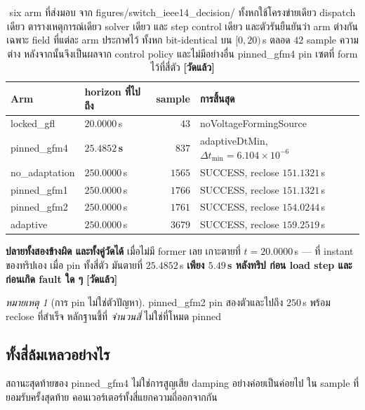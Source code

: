 \documentclass[12pt,a4paper]{article}
\theoremstyle{remark}
\newtheorem{remark}{หมายเหตุ}
\newcommand{\code}[1]{{\ttfamily\small\hyphenchar\font=-1 #1}}
\newcommand{\measured}{\textcolor{ok}{\textbf{[วัดแล้ว]}}}
\begin{document}
\begin{table}[H]
\centering
\small
\begin{tabular}{@{}llrl@{}}
\toprule
\textbf{Arm} & \textbf{horizon ที่ไปถึง} & \textbf{sample} & \textbf{การสิ้นสุด}\\
\midrule
\code{locked\_gfl}     & $20.0000$\,s & $43$       & \code{noVoltageFormingSource}\\
\code{pinned\_gfm4}    & \textcolor{no}{$\mathbf{25.4852}$\,\textbf{s}} & $837$ & \code{adaptiveDtMin}, $\Delta t_{\min}=6.104\times10^{-6}$\\
\code{no\_adaptation}  & $250.0000$\,s & $1565$   & \code{SUCCESS}, reclose $151.1321$\,s\\
\code{pinned\_gfm1}    & $250.0000$\,s & $1766$   & \code{SUCCESS}, reclose $151.1321$\,s\\
\code{pinned\_gfm2}    & $250.0000$\,s & $1761$   & \code{SUCCESS}, reclose $154.0244$\,s\\
\code{adaptive}        & $250.0000$\,s & $3679$   & \code{SUCCESS}, reclose $159.2519$\,s\\
\bottomrule
\end{tabular}
\caption{six arm ที่ส่งมอบ จาก
\code{figures/switch\_ieee14\_decision/}\allowbreak\code{comparison\_summary.tex}
ทั้งหกใช้โครงข่ายเดียว dispatch เดียว ตารางเหตุการณ์เดียว solver เดียว และ
step control เดียว และตัวรันยืนยันว่า arm ต่างกันเฉพาะ field ที่แต่ละ arm
ประกาศไว้ ทั้งหก bit-identical บน $[0,20)$\,s ตลอด $42$ sample ความต่าง
หลังจากนั้นจึงเป็นผลจาก control policy และไม่มีอย่างอื่น
\code{pinned\_gfm4} pin เซตที่ form ไว้ที่สี่ตัว \measured}
\label{tab:armcmp}
\end{table}

\textbf{ปลายทั้งสองข้างผิด และทั้งคู่วัดได้} เมื่อไม่มี former เลย เกาะตายที่
$t=20.0000$\,s --- ที่ instant ของทริปเอง เมื่อ pin ทั้งสี่ตัว มันตายที่
$25.4852$\,s \textbf{เพียง $5.49$\,s หลังทริป ก่อน load step และก่อนเกิด
fault ใด ๆ} \measured

\begin{remark}[การ pin ไม่ใช่ตัวปัญหา]
\code{pinned\_gfm2} pin สองตัวและไปถึง $250$\,s พร้อม reclose ที่สำเร็จ
หลักฐานชี้ที่ \emph{จำนวนสี่} ไม่ใช่ที่โหมด pinned
\end{remark}

\subsection{ทั้งสี่ล้มเหลวอย่างไร}

สถานะสุดท้ายของ \code{pinned\_gfm4} ไม่ใช่การสูญเสีย damping อย่างค่อยเป็นค่อยไป
ใน sample ที่ยอมรับครั้งสุดท้าย คอนเวอร์เตอร์ทั้งสี่แยกความถี่ออกจากกัน
\end{document}

